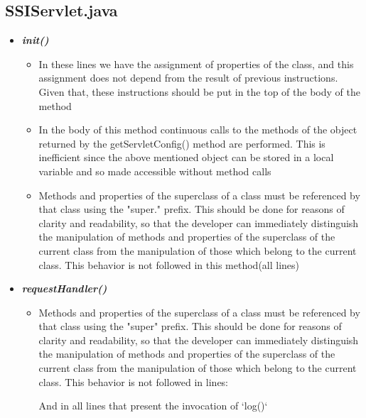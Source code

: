\documentclass[11pt,titlepage]{article} %
\begin{document}
  \subsection{SSIServlet.java}
    \begin{itemize}
      \item \textbf{\textit{init()}}
	\begin{itemize}
	 \item In these lines
	    we have the assignment of properties of the class, and this assignment does not
	    depend from the result of previous instructions. Given that, these instructions should be
	    put in the top of the body of the method
	    
	    
	    

	 \item In the body of this method continuous calls to the methods of the object returned by the
	    getServletConfig() method are performed.
	    This is inefficient since the above mentioned object can be stored in a local variable
	    and so made accessible without method calls
	 \item Methods and properties of the superclass of a class must be referenced by that class using
	    the "super." prefix. This should be done for reasons of clarity and readability, so that
	    the developer can immediately distinguish the manipulation of methods and properties of the superclass of the current class
	    from the manipulation of those which belong to the current class.\newline
	    This behavior is not followed in this method(all lines)

	\end{itemize}

      \item \textbf{\textit{requestHandler()}}
	  \begin{itemize}
	      \item Methods and properties of the superclass of a class must be referenced by that class using
		the "super" prefix. This should be done for reasons of clarity and readability, so that
		the developer can immediately distinguish the manipulation of methods and properties of the superclass of the current class
		from the manipulation of those which belong to the current class.\newline
		This behavior is not followed in lines:
		
		And in all lines that present the invocation of `log()`


\end{itemize}
\end{itemize}
\end{document}
